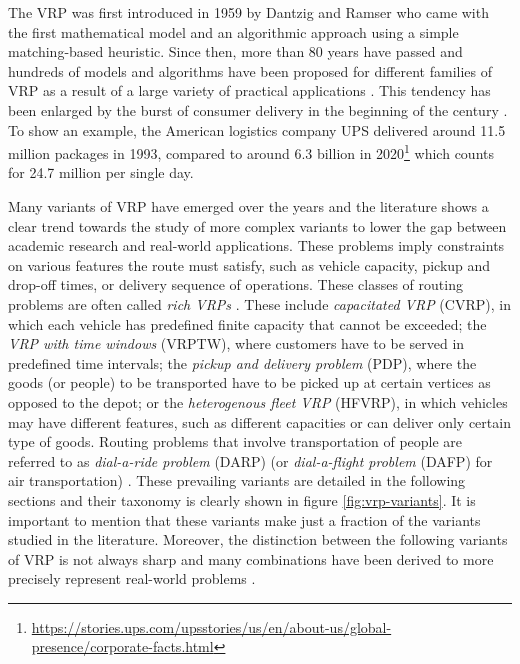 The VRP was first introduced in 1959 by Dantzig and Ramser \cite{1959} who came with the first mathematical model and an algorithmic approach using a simple matching-based heuristic. Since then, more than 80 years have passed and hundreds of models and algorithms have been proposed for different families of VRP as a result of a large variety of practical applications \cite{toth2015vrp}. This tendency has been enlarged by the burst of consumer delivery in the beginning of the century \cite{Falkner2020}. To show an example, the American logistics company UPS delivered around 11.5 million packages in 1993, compared to around 6.3 billion in 2020\footnote{\url{https://stories.ups.com/upsstories/us/en/about-us/global-presence/corporate-facts.html}} which counts for 24.7 million per single day.

Many variants of VRP have emerged over the years and the literature shows a clear trend towards the study of more complex variants to lower the gap between academic research and real-world applications. These problems imply constraints on various features the route must satisfy, such as vehicle capacity, pickup and drop-off times, or delivery sequence of operations. These classes of routing problems are often called \emph{rich VRPs} \cite{Mor2020}. These include \emph{capacitated VRP} (CVRP), in which each vehicle has predefined finite capacity that cannot be exceeded; the \emph{VRP with time windows} (VRPTW), where customers have to be served in predefined time intervals; the \emph{pickup and delivery problem} (PDP), where the goods (or people) to be transported have to be picked up at certain vertices as opposed to the depot; or the \emph{heterogenous fleet VRP} (HFVRP), in which vehicles may have different features, such as different capacities or can deliver only certain type of goods. Routing problems that involve transportation of people are referred to as \emph{dial-a-ride problem} (DARP) (or \emph{dial-a-flight problem} (DAFP) for air transportation) \cite{golden2008the, PILLAC20131}. These prevailing variants are detailed in the following sections and their taxonomy is clearly shown in figure \ref{fig:vrp-variants}. It is important to mention that these variants make just a fraction of the variants studied in the literature. Moreover, the distinction between the following variants of VRP is not always sharp and many combinations have been derived to more precisely represent real-world problems \cite{golden2008the, toth2015vrp, 2007-cordeau, cordeau-2007-7}.

